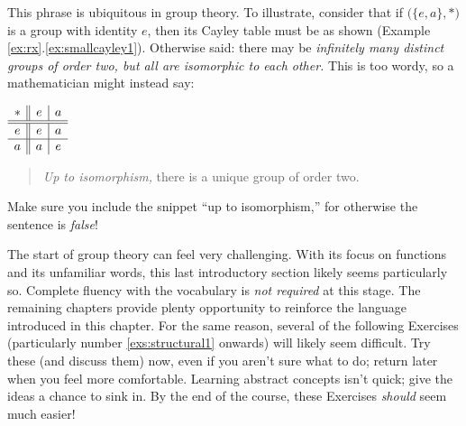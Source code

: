 \label{sec:uptoiso} 

\begin{minipage}[t]{0.85\linewidth}\vspace{-10pt}
	This phrase is ubiquitous in group theory. To illustrate, consider that if $\bigl(\{e,a\},*\bigl)$ is a group with identity $e$, then its Cayley table must be as shown (Example \ref*{ex:rx}.\ref{ex:smallcayley1}). Otherwise said: there may be \emph{infinitely many distinct groups of order two, but all are isomorphic to each other.} This is too wordy, so a mathematician might instead say:
\end{minipage}
\hfill
\begin{minipage}[t]{0.14\linewidth}\vspace{-10pt}
	\flushright%
	$\begin{array}[t]{c||c|c}
		* & e & a\\\hline\hline
		e & e & a\\\hline
		a & a & e
	\end{array}$
\end{minipage}\par

\begin{quote}
	\emph{Up to isomorphism,} there is a unique group of order two.
\end{quote}
Make sure you include the snippet ``up to isomorphism,'' for otherwise the sentence is \emph{false}!


\goodbreak


The start of group theory can feel very challenging. With its focus on functions and its unfamiliar words, this last introductory section likely seems particularly so. Complete fluency with the vocabulary is \emph{not required} at this stage. The remaining chapters provide plenty opportunity to reinforce the language introduced in this chapter.\smallbreak
For the same reason, several of the following Exercises (particularly number \ref*{exs:structural1} onwards) will likely seem difficult. Try these (and discuss them) now, even if you aren't sure what to do; return later when you feel more comfortable. Learning abstract concepts isn't quick; give the ideas a chance to sink in. By the end of the course, these Exercises \emph{should} seem much easier!

